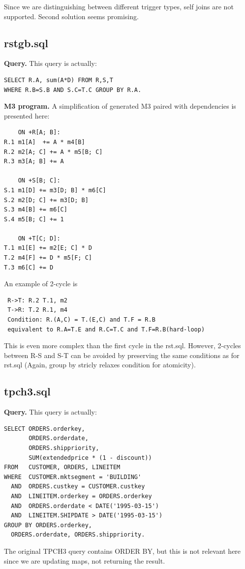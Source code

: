\documentclass{sig-semester}
\begin{document}
Since we are distinguishing between different trigger types, self joins are not supported. Second solution seems promising.

\subsection{rstgb.sql}
\textbf{Query.} This query is actually:
\begin{verbatim}
SELECT R.A, sum(A*D) FROM R,S,T 
WHERE R.B=S.B AND S.C=T.C GROUP BY R.A.
\end{verbatim}

\textbf{M3 program.} A simplification of generated M3 paired with dependencies is presented here:
\begin{verbatim}
    ON +R[A; B]: 
R.1 m1[A]  += A * m4[B]
R.2 m2[A; C] += A * m5[B; C]
R.3 m3[A; B] += A

    ON +S[B; C]: 
S.1 m1[D] += m3[D; B] * m6[C]
S.2 m2[D; C] += m3[D; B]
S.3 m4[B] += m6[C]
S.4 m5[B; C] += 1

    ON +T[C; D]: 
T.1 m1[E] += m2[E; C] * D
T.2 m4[F] += D * m5[F; C]
T.3 m6[C] += D
\end{verbatim}

An example of 2-cycle is
\begin{verbatim}
 R->T: R.2 T.1, m2
 T->R: T.2 R.1, m4
 Condition: R.(A,C) = T.(E,C) and T.F = R.B
 equivalent to R.A=T.E and R.C=T.C and T.F=R.B(hard-loop)
\end{verbatim}
This is even more complex than the first cycle in the rst.sql. However, 2-cycles between R-S and S-T can be avoided by preserving the same conditions as for rst.sql (Again, group by stricly relaxes condition for atomicity).

\subsection{tpch3.sql}
\textbf{Query.} This query is actually:

\begin{verbatim}
SELECT ORDERS.orderkey, 
       ORDERS.orderdate,
       ORDERS.shippriority,
       SUM(extendedprice * (1 - discount))
FROM   CUSTOMER, ORDERS, LINEITEM
WHERE  CUSTOMER.mktsegment = 'BUILDING'
  AND  ORDERS.custkey = CUSTOMER.custkey
  AND  LINEITEM.orderkey = ORDERS.orderkey
  AND  ORDERS.orderdate < DATE('1995-03-15')
  AND  LINEITEM.SHIPDATE > DATE('1995-03-15')
GROUP BY ORDERS.orderkey, 
  ORDERS.orderdate, ORDERS.shippriority.
\end{verbatim}
The original TPCH3 query contains ORDER BY, but this is not relevant here since we are updating maps, not returning the result.
\end{document}
